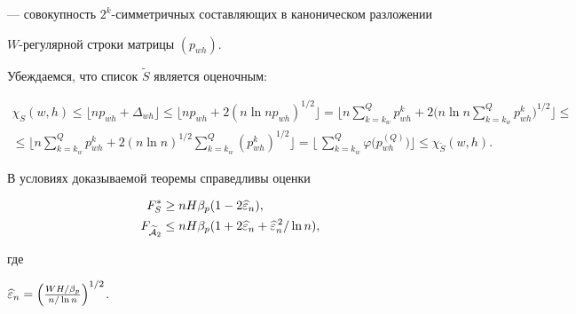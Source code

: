 --- совокупность $2^{k}$-симметричных составляющих в каноническом разложении 


$W$-регулярной строки матрицы $(p_{wh})$.





Убеждаемся, что список $\widetilde S$ является оценочным:


\begin{gather*}


\chi_S(w,h) \le


\lfloor np_{wh} + \Delta_{wh} \rfloor \le


\lfloor np_{wh} + 2(n\ln n p_{wh})^{1/2} \rfloor = 


\biggl\lfloor


n \sum_{k=k_{w}}^{Q}p_{wh}^{k} +


2\biggl(n\ln n \sum_{k=k_{w}}^{Q}p_{wh}^{k}\biggr)^{1/2}


\biggr\rfloor \le \\


%


\le \biggl\lfloor


n \sum_{k=k_{w}}^{Q}p_{wh}^{k} +2(n\ln n)^{1/2} 


\sum_{k=k_{w}}^{Q}(p_{wh}^{k})^{1/2}


\biggr\rfloor =


\biggl\lfloor


\, \sum_{k=k_{w}}^{Q} \varphi \bigl(p_{wh}^{(Q)}\bigr) 


\biggr\rfloor \le


\chi_{\widetilde S}(w,h).


\end{gather*}





\begin{lem} 


\label{lm6}


В условиях доказываемой теоремы справедливы оценки


\begin{align*}


F_{S}^{\ast} & \ge nH\beta_{p} (1-2\widehat {\eps}_{n}),\\


%


F_{\widetilde {\cal A}_{2}} & \le 


nH\beta_{p} (1+2\widehat {\eps}_{n}+


{\widehat {\eps}_{n}}^{{\,}2}/\ln n),


\end{align*}


где


$\widehat {\eps}_{n} = 


\Bigl(\frac {WH/\beta_{p}}{n/\ln n}\Bigr)^{1/2}$.


\end{lem}





